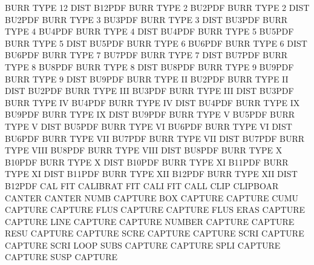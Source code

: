 BURR     TYPE 12   DIST                 B12PDF
BURR     TYPE 2                         BU2PDF
BURR     TYPE 2    DIST                 BU2PDF
BURR     TYPE 3                         BU3PDF
BURR     TYPE 3    DIST                 BU3PDF
BURR     TYPE 4                         BU4PDF
BURR     TYPE 4    DIST                 BU4PDF
BURR     TYPE 5                         BU5PDF
BURR     TYPE 5    DIST                 BU5PDF
BURR     TYPE 6                         BU6PDF
BURR     TYPE 6    DIST                 BU6PDF
BURR     TYPE 7                         BU7PDF
BURR     TYPE 7    DIST                 BU7PDF
BURR     TYPE 8                         BU8PDF
BURR     TYPE 8    DIST                 BU8PDF
BURR     TYPE 9                         BU9PDF
BURR     TYPE 9    DIST                 BU9PDF
BURR     TYPE II                        BU2PDF
BURR     TYPE II   DIST                 BU2PDF
BURR     TYPE III                       BU3PDF
BURR     TYPE III  DIST                 BU3PDF
BURR     TYPE IV                        BU4PDF
BURR     TYPE IV   DIST                 BU4PDF
BURR     TYPE IX                        BU9PDF
BURR     TYPE IX   DIST                 BU9PDF
BURR     TYPE V                         BU5PDF
BURR     TYPE V    DIST                 BU5PDF
BURR     TYPE VI                        BU6PDF
BURR     TYPE VI   DIST                 BU6PDF
BURR     TYPE VII                       BU7PDF
BURR     TYPE VII  DIST                 BU7PDF
BURR     TYPE VIII                      BU8PDF
BURR     TYPE VIII DIST                 BU8PDF
BURR     TYPE X                         B10PDF
BURR     TYPE X    DIST                 B10PDF
BURR     TYPE XI                        B11PDF
BURR     TYPE XI   DIST                 B11PDF
BURR     TYPE XII                       B12PDF
BURR     TYPE XII  DIST                 B12PDF
CAL                                     FIT
CALIBRAT                                FIT
CALI                                    FIT
CALL     CLIP                           CLIPBOAR
CANTER                                  CANTER   NUMB
CAPTURE  BOX                            CAPTURE
CAPTURE  CUMU                           CAPTURE
CAPTURE  FLUS                           CAPTURE
CAPTURE  FLUS ERAS                      CAPTURE
CAPTURE  LINE                           CAPTURE
CAPTURE  NUMBER                         CAPTURE
CAPTURE  RESU                           CAPTURE
CAPTURE  SCRE                           CAPTURE
CAPTURE  SCRI                           CAPTURE
CAPTURE  SCRI LOOP SUBS                 CAPTURE
CAPTURE  SPLI                           CAPTURE
CAPTURE  SUSP                           CAPTURE

